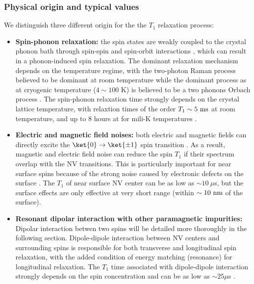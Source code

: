 \documentclass[a4paper, 11pt]{book}
\begin{document}
\subsubsection{Physical origin and typical values}

We distinguish three different origin for the the $T_1$ relaxation process:
\begin{itemize}
\item \textbf{Spin-phonon relaxation:} the spin states are weakly coupled to the crystal phonon bath through spin-spin and spin-orbit interactions \citep{norambuena2018spin}, which can result in a phonon-induced spin relaxation. The dominant relaxation mechanism depends on the  temperature regime, with the two-photon Raman process believed to be dominant at room temperature \citep{takahashi2008quenching, jarmola2012temperature} while the dominant process as at cryogenic temperature ($4\sim100$ K) is believed to be a two phonons Orbach process \citep{redman1991spin, norambuena2018spin}. The spin-phonon relaxation time strongly depends on the crystal lattice temperature, with relaxtion times of the order $T_1 \sim 5\ \rm ms$ at room temperature, and up to 8 hours at for mili-K temperatures \citep{astner2018solid}.

\item \textbf{Electric and magnetic field noises:} both electric and magnetic fields can directly excite the $\ket{0} \to \ket{\pm 1}$ spin transition \citep{udvarhelyi2018spin}. As a result, magnetic and electric field noise can reduce the spin $T_1$ if their spectrum overlap with the NV transitions. This is particularly important for near surface spins because of the strong noise caused by electronic defects on the surface \citep{sangtawesin2019origins}. The $T_1$ of near surface NV center can be as low as $\sim 10\ \mu$s, but the surface effects are only effective at very short range (within $\sim 10\ \rm nm$ of the surface).

\item \textbf{Resonant dipolar interaction with other paramagnetic impurities:} Dipolar interaction betwen two spins will be detailed more thoroughly in the following section. Dipole-dipole interaction between NV centers and surrounding spins is responsible for both transverse and longitudinal spin relaxation, with the added condition of energy matching (resonance) for longitudinal relaxation. The $T_1$ time associated with dipole-dipole interaction strongly depends on the spin concentration and can be as low as $\sim 25 \mu$s \citep{hall2016detection}.
\end{itemize}
\end{document}
